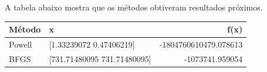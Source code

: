 \documentclass[12pt]{article}
\begin{document}
A tabela abaixo mostra que os métodos obtiveram resultados próximos.

\begin{table}[H]
\centering
\begin{tabular}{llr}
  \hline
  Método & x & f(x) \\
  \hline
  Powell & [1.33239072 0.47406219] & -1804760610479.078613 \\
  BFGS & [731.71480095 731.71480095] & -1073741.959054 \\
  \hline
  \end{tabular}
\end{table}
\end{document}
